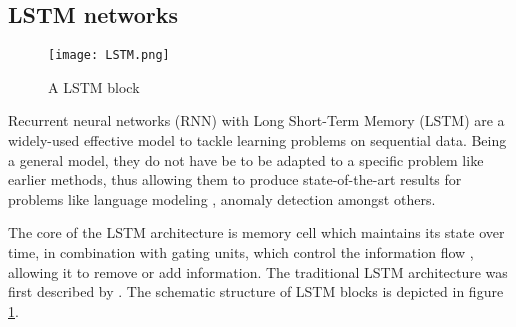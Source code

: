 \begin{comment}
Figure \ref{fig:simple_neural_network} shows a simple neural network with three input features $v_1, v_2, v_3$. The output neuron is composed of the forward propagation function given by the weighted sums of neuron values, where the weights are $w_i$, and the activation function given by $h$. There exists a large variety of activation functions in use, depending on the given use case. The learning process of a neural network consists of learning the weights

Training of a neural network happens through 
Training of a neural network can be done in an \textit{unsupervised} and \textit{supervised} manner. Supervised training of 
The complexity of neural networks can be increased by adding more neurons and additional layers, making it possible to process larger input and potentially receive better results in prediction. The concept of the traditional feedforward neural networks is subject to constant architectural enhancement. 

Through the surge of available cheap computing power, deep learning models with high numbers of layers of neurons can be trained on large amounts of data. Also, the concept of the traditional neural network is constantly being 
\end{comment}



\subsection{LSTM networks \label{sec:lstm}}
\begin{figure}[h]
  \centering
  \texttt{[image: LSTM.png]}\\
  \caption{A LSTM block \cite{graves2013speech}}
  \label{fig:lstm_blocks}
\end{figure}


Recurrent neural networks (RNN) with Long Short-Term Memory (LSTM) are a widely-used effective model to tackle learning problems on sequential data. Being a general model, they do not have be to be adapted to a specific problem like earlier methods, thus allowing them to produce state-of-the-art results for problems like language modeling \cite{peters2018deep}, anomaly detection \cite{du2017deeplog} amongst others.

The core of the LSTM architecture is memory cell which maintains its state over time, in combination with gating units, which control the information flow \cite{greff2016lstm}, allowing it to remove or add information. The traditional LSTM architecture was first described by \cite{graves2005framewise}. The schematic structure of LSTM blocks is depicted in figure \ref{fig:lstm_blocks}. 

